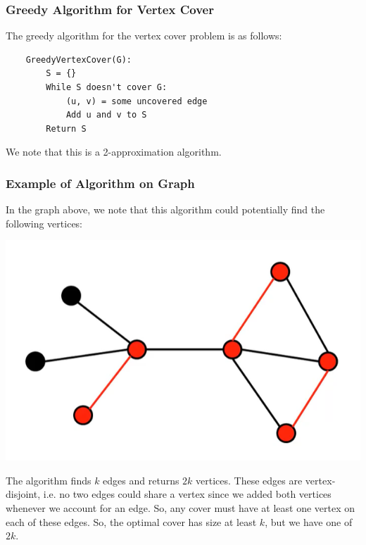 \documentclass[letterpaper]{article}
\begin{document}
\subsubsection{Greedy Algorithm for Vertex Cover}
The greedy algorithm for the vertex cover problem is as follows: 
\begin{verbatim}
    GreedyVertexCover(G):
        S = {}
        While S doesn't cover G:
            (u, v) = some uncovered edge 
            Add u and v to S
        Return S
\end{verbatim}
We note that this is a 2-approximation algorithm. 

\subsubsection{Example of Algorithm on Graph}
In the graph above, we note that this algorithm could potentially find the following vertices:
\begin{center}
    \includegraphics[scale=0.5]{assets/vertex_cov_3.png}
\end{center}
The algorithm finds $k$ edges and returns $2k$ vertices. These edges are vertex-disjoint, i.e. no two edges could share a vertex since we added both vertices whenever we account for an edge. So, any cover must have at least one vertex on each of these edges. So, the optimal cover has size at least $k$, but we have one of $2k$. 
\end{document}
